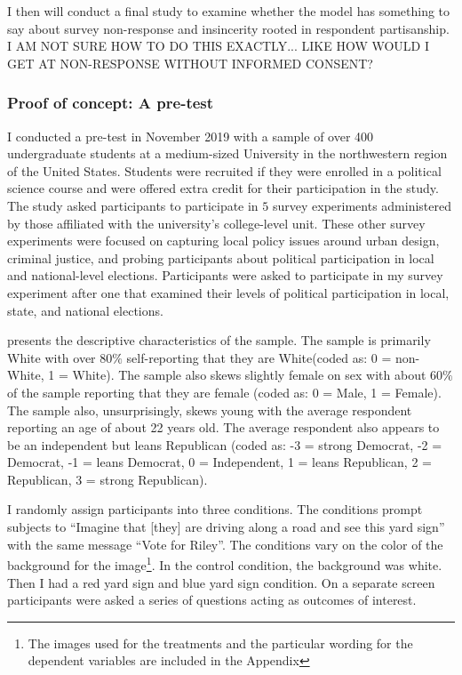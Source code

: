 \documentclass [12pt]{article}
\begin{document}
I then will conduct a final study to examine whether the model has something to say about survey non-response and insincerity rooted in respondent partisanship. I AM NOT SURE HOW TO DO THIS EXACTLY... LIKE HOW WOULD I GET AT NON-RESPONSE WITHOUT INFORMED CONSENT?

        \subsubsection*{Proof of concept: A pre-test}

I conducted a pre-test in November 2019 with a sample of over 400 undergraduate students at a medium-sized University in the northwestern region of the United States. Students were recruited if they were enrolled in a political science course and were offered extra credit for their participation in the study. The study asked participants to participate in $5$ survey experiments administered by those affiliated with the university's college-level unit. These other survey experiments were focused on capturing local policy issues around urban design, criminal justice, and probing participants about political participation in local and national-level elections. Participants were asked to participate in my survey experiment after one that examined their levels of political participation in local, state, and national elections.

 presents the descriptive characteristics of the sample. The sample is primarily White with over $80\%$ self-reporting that they are White(coded as: 0 = non-White, 1 = White). The sample also skews slightly female on sex with about $60\%$ of the sample reporting that they are female (coded as: 0 = Male, 1 = Female). The sample also, unsurprisingly, skews young with the average respondent reporting an age of about 22 years old. The average respondent also appears to be an independent but leans Republican (coded as: -3 = strong Democrat, -2 = Democrat, -1 = leans Democrat, 0 = Independent, 1 = leans Republican, 2 = Republican, 3 = strong Republican).

I randomly assign participants into three conditions. The conditions prompt subjects to ``Imagine that [they] are driving along a road and see this yard sign'' with the same message ``Vote for Riley''. The conditions vary on the color of the background for the image\footnote{The images used for the treatments and the particular wording for the dependent variables are included in the Appendix}. In the control condition, the background was white. Then I had a red yard sign and blue yard sign condition. On a separate screen participants were asked a series of questions acting as outcomes of interest.
\end{document}
